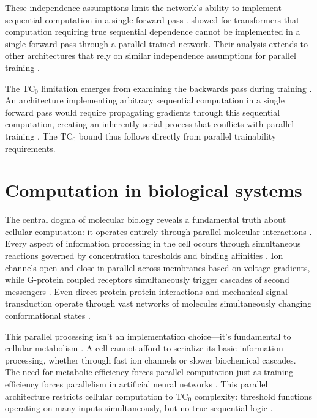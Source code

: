 \documentclass[12pt]{article}
\begin{document}
These independence assumptions limit the network's ability to implement sequential computation in a single forward pass \cite{wei2022chain}.
\cite{merrill2023parallelism} showed for transformers that computation requiring true sequential dependence cannot be implemented in a single forward pass through a parallel-trained network.
Their analysis extends to other architectures that rely on similar independence assumptions for parallel training \cite{stillman2023generative}.

The $\text{TC}_0$ limitation emerges from examining the backwards pass during training \cite{jung2020new}.
An architecture implementing arbitrary sequential computation in a single forward pass would require propagating gradients through this sequential computation, creating an inherently serial process that conflicts with parallel training \cite{zhu2024overcoming}.
The $\text{TC}_0$ bound thus follows directly from parallel trainability requirements.

\section{Computation in biological systems}

The central dogma of molecular biology reveals a fundamental truth about cellular computation: it operates entirely through parallel molecular interactions \cite{wang2023parallel,cai2024efficient,fu2023scgrn}.
Every aspect of information processing in the cell occurs through simultaneous reactions governed by concentration thresholds and binding affinities \cite{alberts2022molecular}.
Ion channels open and close in parallel across membranes based on voltage gradients, while G-protein coupled receptors simultaneously trigger cascades of second messengers \cite{alberts2022molecular}.
Even direct protein-protein interactions and mechanical signal transduction operate through vast networks of molecules simultaneously changing conformational states \cite{alberts2022molecular,berridge2014cell}.

This parallel processing isn't an implementation choice---it's fundamental to cellular metabolism \cite{cai2024efficient,hoel2020emergence}.
A cell cannot afford to serialize its basic information processing, whether through fast ion channels or slower biochemical cascades.
The need for metabolic efficiency forces parallel computation just as training efficiency forces parallelism in artificial neural networks \cite{barrett2019analyzing}.
This parallel architecture restricts cellular computation to $\text{TC}_0$ complexity: threshold functions operating on many inputs simultaneously, but no true sequential logic \cite{wang2023parallel}.
\end{document}
